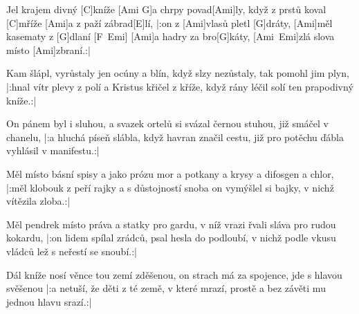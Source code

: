 
\sloka
[Ami]Jel krajem divný [C]kníže [Ami G]a chrpy povad[Ami]ly,
když z prstů koval [C]mříže [Ami]a z paží zábrad[E]lí,
|:on z [Ami]vlasů pletl [G]dráty, [Ami]měl kasematy z [G]dlaní [F\ Emi]
[Ami]a hadry za bro[G]káty, [Ami\ Emi]zlá slova místo [Ami]zbraní.:|

\sloka
Kam šlápl, vyrůstaly jen ocúny a blín,
když slzy nezůstaly, tak pomohl jim plyn,
|:hnal vítr plevy z polí a Kristus křičel z kříže,
když rány léčil solí ten prapodivný kníže.:|

\sloka
On pánem byl i sluhou, a svazek ortelů
si svázal černou stuhou, již smáčel v chanelu,
|:a hluchá píseň slábla, když havran značil cestu,
již pro potěchu ďábla vyhlásil v manifestu.:|

\sloka
Měl místo básní spisy a jako prózu mor
a potkany a krysy a difosgen a chlor,
|:měl klobouk z peří rajky a s důstojností snoba
on vymýšlel si bajky, v nichž vítězila zloba.:|

\sloka
Měl pendrek místo práva a statky pro gardu,
v níž vrazi řvali sláva pro rudou kokardu,
|:on lidem spílal zrádců, psal hesla do podloubí,
v nichž podle vkusu vládců lež s neřestí se snoubí.:|

\sloka
Dál kníže nosí věnce tou zemí zděšenou,
on strach má za spojence, jde s hlavou svěšenou
|:a netuší, že děti z té země, v které mrazí,
prostě a bez závěti mu jednou hlavu srazí.:|
